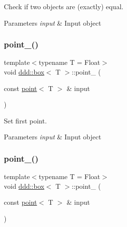 Check if two objects are (exactly) equal. 


\begin{DoxyParams}{Parameters}
{\em input} & Input object \\
\hline
\end{DoxyParams}
\mbox{\label{classddd_1_1box_a1c93232933a611b9e8acfac01381e36e}} 
\subsubsection{\texorpdfstring{point\+\_()}{point\_1()}}
{\footnotesize\ttfamily template$<$typename T = Float$>$ \\
void \hyperlink{classddd_1_1box}{ddd\+::box}$<$ T $>$\+::point\+\_ (\begin{DoxyParamCaption}\item[{const \hyperlink{classddd_1_1point}{point}$<$ T $>$ \&}]{input }\end{DoxyParamCaption})\hspace{0.3cm}{\ttfamily [inline]}}



Set first point. 


\begin{DoxyParams}{Parameters}
{\em input} & Input object \\
\hline
\end{DoxyParams}
\mbox{\label{classddd_1_1box_a0ee76a1b2aba5285c3bf954bc5cc12ef}} 
\subsubsection{\texorpdfstring{point\+\_()}{point\_2()}}
{\footnotesize\ttfamily template$<$typename T = Float$>$ \\
void \hyperlink{classddd_1_1box}{ddd\+::box}$<$ T $>$\+::point\+\_ (\begin{DoxyParamCaption}\item[{const \hyperlink{classddd_1_1point}{point}$<$ T $>$ \&}]{input }\end{DoxyParamCaption})\hspace{0.3cm}{\ttfamily [inline]}}



